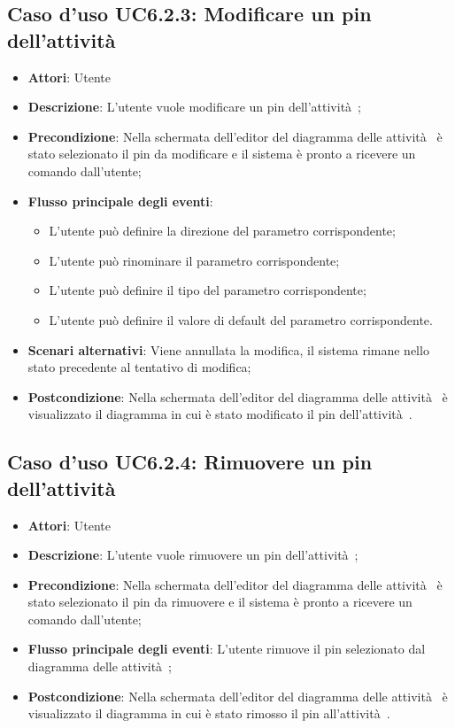 \documentclass[../AnalisiDeiRequisiti.tex]{subfiles}
\begin{document}
				\subsection{Caso d'uso UC6.2.3: Modificare un pin dell'attività }
				\begin{itemize}
					\item \textbf{Attori}: Utente
					\item \textbf{Descrizione}: L'utente vuole modificare un pin dell'attività ;
					\item \textbf{Precondizione}: Nella schermata dell'editor del diagramma delle attività  è stato selezionato il pin da modificare e il sistema è pronto a ricevere un comando dall'utente;
					\item \textbf{Flusso principale degli eventi}: \begin{itemize}
					\item L'utente può definire la direzione del parametro corrispondente;
					\item L'utente può rinominare il parametro corrispondente;
					\item L'utente può definire il tipo del parametro corrispondente;
					\item L'utente può definire il valore di default del parametro corrispondente.
				\end{itemize}
					\item \textbf{Scenari alternativi}: Viene annullata la modifica, il sistema rimane nello stato precedente al tentativo di modifica;
					\item \textbf{Postcondizione}: Nella schermata dell'editor del diagramma delle attività  è visualizzato il diagramma in cui è stato modificato il pin dell'attività .
				\end{itemize}
				\subsection{Caso d'uso UC6.2.4: Rimuovere un pin dell'attività }
				\begin{itemize}
					\item \textbf{Attori}: Utente
					\item \textbf{Descrizione}: L'utente vuole rimuovere un pin dell'attività ;
					\item \textbf{Precondizione}: Nella schermata dell'editor del diagramma delle attività  è stato selezionato il pin da rimuovere e il sistema è pronto a ricevere un comando dall'utente;
					\item \textbf{Flusso principale degli eventi}: L'utente rimuove il pin selezionato dal diagramma delle attività ;
					\item \textbf{Postcondizione}: Nella schermata dell'editor del diagramma delle attività  è visualizzato il diagramma in cui è stato rimosso il pin all'attività .
				\end{itemize}
\end{document}
